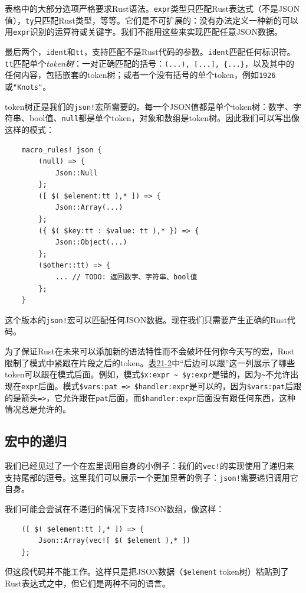 表格中的大部分选项严格要求Rust语法。\texttt{expr}类型只匹配Rust表达式（不是JSON值），\texttt{ty}只匹配Rust类型，等等。它们是不可扩展的：没有办法定义一种新的可以用\texttt{expr}识别的运算符或关键字。我们不能用这些来实现匹配任意JSON数据。

最后两个，\texttt{ident}和\texttt{tt}，支持匹配不是Rust代码的参数。\texttt{ident}匹配任何标识符。\texttt{tt}匹配单个\emph{token树}：一对正确匹配的括号：\texttt{(...), [...], \{...\}}，以及其中的任何内容，包括嵌套的token树；或者一个没有括号的单个token，例如\texttt{1926}或\texttt{"Knots"}。

token树正是我们的\texttt{json!}宏所需要的。每一个JSON值都是单个token树：数字、字符串、bool值、\texttt{null}都是单个token，对象和数组是token树。因此我们可以写出像这样的模式：
\begin{verbatim}
    macro_rules! json {
        (null) => {
            Json::Null
        };
        ([ $( $element:tt ),* ]) => {
            Json::Array(...)
        };
        ({ $( $key:tt : $value: tt ),* }) => {
            Json::Object(...)
        };
        ($other::tt) => {
            ... // TODO: 返回数字、字符串、bool值
        };
    }
\end{verbatim}

这个版本的\texttt{json!}宏可以匹配任何JSON数据。现在我们只需要产生正确的Rust代码。

为了保证Rust在未来可以添加新的语法特性而不会破坏任何你今天写的宏，Rust限制了模式中紧跟在片段之后的token。\hyperref[t21-2]{表21-2}中“后边可以跟”这一列展示了哪些token可以跟在模式后面。例如，模式\texttt{\$x:expr \textasciitilde{} \$y:expr}是错的，因为\texttt{\textasciitilde{}}不允许出现在\texttt{expr}后面。模式\texttt{\$vars:pat => \$handler:expr}是可以的，因为\texttt{\$vars:pat}后跟的是箭头\texttt{=>}，它允许跟在\texttt{pat}后面，而\texttt{\$handler:expr}后面没有跟任何东西，这种情况总是允许的。

\subsection{宏中的递归}
我们已经见过了一个在宏里调用自身的小例子：我们的\texttt{vec!}的实现使用了递归来支持尾部的逗号。这里我们可以展示一个更加显著的例子：\texttt{json!}需要递归调用它自身。

我们可能会尝试在不递归的情况下支持JSON数组，像这样：
\begin{verbatim}
    ([ $( $element:tt ),* ]) => {
        Json::Array(vec![ $( $element ),* ])
    };
\end{verbatim}
但这段代码并不能工作。这样只是把JSON数据（\texttt{\$element} token树）粘贴到了Rust表达式之中，但它们是两种不同的语言。

